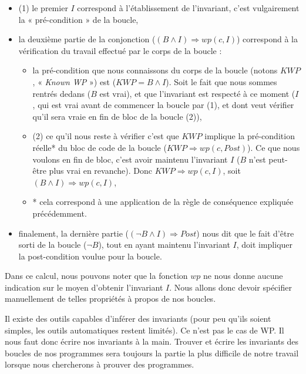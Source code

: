 \documentclass[middle]{zmdocument}
\begin{document}
\begin{itemize}
\item (1) le premier $I$ correspond à l'établissement de l'invariant, c'est 
vulgairement la « pré-condition » de la boucle,
\item la deuxième partie de la conjonction ($(B \wedge I) \Rightarrow wp(c, I)$)
correspond à la vérification du travail effectué par le corps de la boucle :

\begin{itemize}
\item la pré-condition que nous connaissons du corps de la boucle (notons $KWP$,
« \textit{Known WP} ») est ($KWP = B \wedge I$). Soit le fait que nous sommes
rentrés dedans ($B$ est vrai), et que l'invariant est respecté à ce moment
($I$, qui est vrai avant de commencer la boucle par (1), et dont veut 
vérifier qu'il sera vraie en fin de bloc de la boucle (2)),
\item (2) ce qu'il nous reste à vérifier c'est que $KWP$ implique la 
pré-condition réelle* du bloc de code de la boucle 
  ($KWP \Rightarrow wp(c, Post)$). Ce que nous voulons en fin de bloc, 
  c'est avoir maintenu l'invariant $I$ ($B$ n'est peut-être plus vrai en
  revanche). Donc 
$KWP \Rightarrow wp(c, I)$, soit $(B \wedge I) \Rightarrow wp(c, I)$,
\item * cela correspond à une application de la règle de conséquence expliquée
précédemment.
\end{itemize}
\item finalement, la dernière partie ($(\neg B \wedge I) \Rightarrow Post$)
nous dit que le fait d'être sorti de la boucle ($\neg B$), tout en ayant 
maintenu l'invariant $I$, doit impliquer la post-condition voulue pour la 
boucle.
\end{itemize}


Dans ce calcul, nous pouvons noter que la fonction $wp$ ne nous donne aucune
indication sur le moyen d'obtenir l'invariant $I$. Nous allons donc devoir 
spécifier manuellement de telles propriétés à propos de nos boucles.





Il existe des outils capables d'inférer des invariants (pour peu qu'ils soient
simples, les outils automatiques restent limités). Ce n'est pas le cas de WP.
Il nous faut donc écrire nos invariants à la main. Trouver et écrire les 
invariants des boucles de nos programmes sera toujours la partie la plus difficile
de notre travail lorsque nous chercherons à prouver des programmes.
\end{document}

